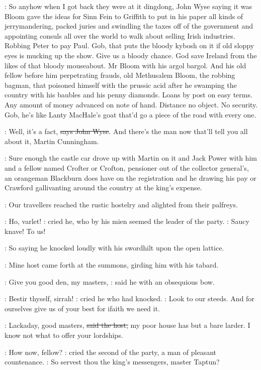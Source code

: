 \Nq:
So anyhow when I got back they were at it dingdong, John Wyse
saying it was Bloom gave the ideas for Sinn Fein to Griffith to put in his
paper all kinds of jerrymandering, packed juries and swindling the taxes
off of the government and appointing consuls all over the world to walk
about selling Irish industries. Robbing Peter to pay Paul. Gob, that puts
the bloody kybosh on it if old sloppy eyes is mucking up the show. Give us
a bloody chance. God save Ireland from the likes of that bloody
mouseabout. Mr Bloom with his argol bargol. And his old fellow before him
perpetrating frauds, old Methusalem Bloom, the robbing bagman, that
poisoned himself with the prussic acid after he swamping the country with
his baubles and his penny diamonds. Loans by post on easy terms. Any
amount of money advanced on note of hand. Distance no object. No security.
Gob, he's like Lanty MacHale's goat that'd go a piece of the road with
every one.

\johnwyse:
Well, it's a fact, \sout{says John Wyse}.
And there's the man now that'll tell
you all about it, Martin Cunningham.

\Nq:
Sure enough the castle car drove up with Martin on it and Jack Power
with him and a fellow named Crofter or Crofton, pensioner out of the
collector general's, an orangeman Blackburn does have on the registration
and he drawing his pay or Crawford gallivanting around the country at the
king's expense.

:
Our travellers reached the rustic hostelry and alighted from their
palfreys.

\cunningham:
Ho, varlet!
:
cried he, who by his mien seemed the leader of the party.
\cunningham:
Saucy knave! To us!

:
So saying he knocked loudly with his swordhilt upon the open lattice.

:
Mine host came forth at the summons, girding him with his tabard.

\terry:
Give you good den, my masters,
:
said he with an obsequious bow.

\cunningham:
Bestir thyself, sirrah!
:
cried he who had knocked.
\cunningham:
Look to our steeds.
And for ourselves give us of your best for ifaith we need it.

\terry:
Lackaday, good masters, \sout{said the host,}
my poor house has but a bare
larder. I know not what to offer your lordships.

\power:
How now, fellow?
:
cried the second of the party, a man of pleasant countenance.
\power:
So servest thou the king's messengers, master Taptun?

